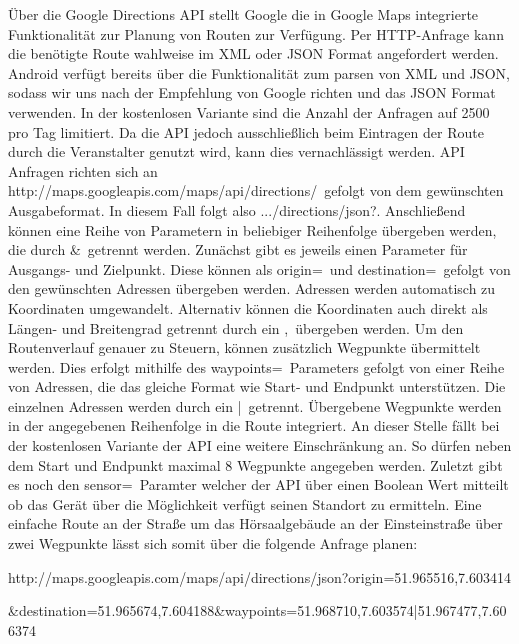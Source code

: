 \label{par:GoogleDirectionsAPI}
Über die Google Directions API stellt Google die in Google Maps integrierte Funktionalität zur Planung von Routen zur Verfügung. Per HTTP-Anfrage kann die benötigte Route wahlweise im XML oder JSON Format angefordert werden. Android verfügt bereits über die Funktionalität zum parsen von XML und JSON, sodass wir uns nach der Empfehlung von Google richten und das JSON Format verwenden. In der kostenlosen Variante sind die Anzahl der Anfragen auf 2500 pro Tag limitiert. Da die API jedoch ausschließlich beim Eintragen der Route durch die Veranstalter genutzt wird, kann dies vernachlässigt werden. API Anfragen richten sich an \glqq http://maps.googleapis.com/maps/api/directions/\grqq\ gefolgt von dem gewünschten Ausgabeformat. In diesem Fall folgt also \glqq.../directions/json?\grqq. Anschließend können eine Reihe von Parametern in beliebiger Reihenfolge übergeben werden, die durch \glqq\&\grqq\ getrennt werden. Zunächst gibt es jeweils einen Parameter für Ausgangs- und Zielpunkt. Diese können als \glqq origin=\grqq\ und \glqq destination=\grqq\ gefolgt von den gewünschten Adressen übergeben werden. Adressen werden automatisch zu Koordinaten umgewandelt. Alternativ können die Koordinaten auch direkt als Längen- und Breitengrad getrennt durch ein \glqq,\grqq\ übergeben werden. Um den Routenverlauf genauer zu Steuern, können zusätzlich Wegpunkte übermittelt werden. Dies erfolgt mithilfe des \glqq waypoints=\grqq\ Parameters gefolgt von einer Reihe von Adressen, die das gleiche Format wie Start- und Endpunkt unterstützen. Die einzelnen Adressen werden durch ein \glqq|\grqq\ getrennt. Übergebene Wegpunkte werden in der angegebenen Reihenfolge in die Route integriert. An dieser Stelle fällt bei der kostenlosen Variante der API eine weitere Einschränkung an. So dürfen neben dem Start und Endpunkt maximal 8 Wegpunkte angegeben werden. Zuletzt gibt es noch den \glqq sensor=\grqq\ Paramter welcher der API über einen Boolean Wert mitteilt ob das Gerät über die Möglichkeit verfügt seinen Standort zu ermitteln. Eine einfache Route an der Straße um das Hörsaalgebäude an der Einsteinstraße über zwei Wegpunkte lässt sich somit über die folgende Anfrage planen:

http://maps.googleapis.com/maps/api/directions/json?origin=51.965516,7.603414

\&destination=51.965674,7.604188\&waypoints=51.968710,7.603574|51.967477,7.606374


